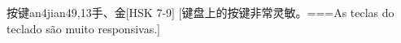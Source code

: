 \begin{EntryWithPhonetic}{按键}{an4jian4}{9,13}{⼿、⾦}[HSK 7-9]
  [键盘上的按键非常灵敏。===As teclas do teclado são muito responsivas.]
\end{EntryWithPhonetic}
